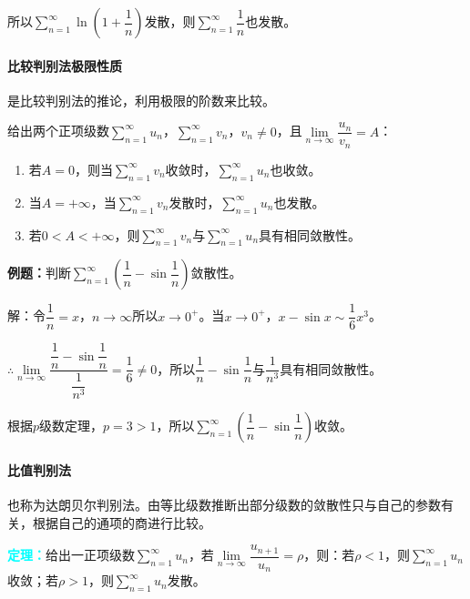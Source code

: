 \documentclass[UTF8, 12pt]{ctexart}
\begin{document}
        所以$\sum\limits_{n=1}^\infty\ln\left(1+\dfrac{1}{n}\right)$发散，则$\sum\limits_{n=1}^\infty\dfrac{1}{n}$也发散。

        \paragraph{比较判别法极限性质} \leavevmode \medskip

        是比较判别法的推论，利用极限的阶数来比较。

        给出两个正项级数$\sum\limits_{n=1}^\infty u_n$，$\sum\limits_{n=1}^\infty v_n$，$v_n\neq0$，且$\lim\limits_{n\to\infty}\dfrac{u_n}{v_n}=A$：

        \begin{enumerate}
            \item 若$A=0$，则当$\sum\limits_{n=1}^\infty v_n$收敛时，$\sum\limits_{n=1}^\infty u_n$也收敛。
            \item 当$A=+\infty$，当$\sum\limits_{n=1}^\infty v_n$发散时，$\sum\limits_{n=1}^\infty u_n$也发散。
            \item 若$0<A<+\infty$，则$\sum\limits_{n=1}^\infty v_n$与$\sum\limits_{n=1}^\infty u_n$具有相同敛散性。
        \end{enumerate}

        \textbf{例题：}判断$\sum\limits_{n=1}^\infty\left(\dfrac{1}{n}-\sin\dfrac{1}{n}\right)$敛散性。

        解：令$\dfrac{1}{n}=x$，$n\to\infty$所以$x\to0^+$。当$x\to0^+$，$x-\sin x\sim\dfrac{1}{6}x^3$。

        $\therefore\lim\limits_{n\to\infty}\dfrac{\dfrac{1}{n}-\sin\dfrac{1}{n}}{\dfrac{1}{n^3}}=\dfrac{1}{6}\neq0$，所以$\dfrac{1}{n}-\sin\dfrac{1}{n}$与$\dfrac{1}{n^3}$具有相同敛散性。

        根据$p$级数定理，$p=3>1$，所以$\sum\limits_{n=1}^\infty\left(\dfrac{1}{n}-\sin\dfrac{1}{n}\right)$收敛。

        \paragraph{比值判别法} \leavevmode \medskip

        也称为达朗贝尔判别法。由等比级数推断出部分级数的敛散性只与自己的参数有关，根据自己的通项的商进行比较。

        \textcolor{aqua}{\textbf{定理：}}给出一正项级数$\sum\limits_{n=1}^\infty u_n$，若$\lim\limits_{n\to\infty}\dfrac{u_{n+1}}{u_n}=\rho$，则：若$\rho<1$，则$\sum\limits_{n=1}^\infty u_n$收敛；若$\rho>1$，则$\sum\limits_{n=1}^\infty u_n$发散。
\end{document}
